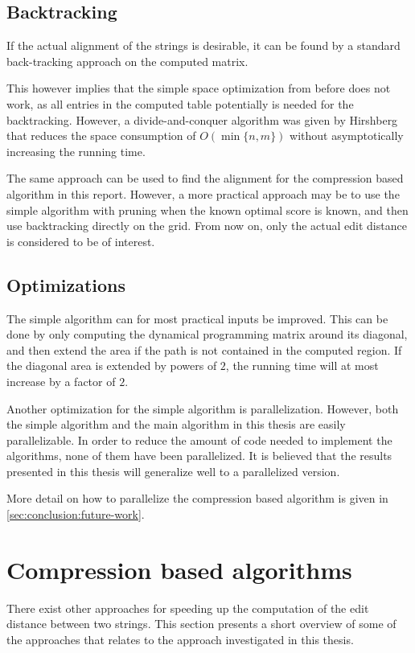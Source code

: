\documentclass[twoside,11pt,openright]{report}
\begin{document}
\subsection{Backtracking}
If the actual alignment of the strings is desirable, it can be found by a standard back-tracking approach on the computed matrix.

This however implies that the simple space optimization from before does not work, as all entries in the computed table potentially is needed for the backtracking. However, a divide-and-conquer algorithm was given by Hirshberg \cite[p. 254]{gusfield1997algorithms} that reduces the space consumption of $O(\min\{n, m\})$ without asymptotically increasing the running time.

The same approach can be used to find the alignment for the compression based algorithm in this report. However, a more practical approach may be to use the simple algorithm with pruning when the known optimal score is known, and then use backtracking directly on the grid. From now on, only the actual edit distance is considered to be of interest.

\subsection{Optimizations}
The simple algorithm can for most practical inputs be improved. This can be done by only computing the dynamical programming matrix around its diagonal, and then extend the area if the path is not contained in the computed region. If the diagonal area is extended by powers of $2$, the running time will at most increase by a factor of $2$.

Another optimization for the simple algorithm is parallelization. However, both the simple algorithm and the main algorithm in this thesis \cite{Gawrychowski:2012:FAC:2422024.2422048} are easily parallelizable. In order to reduce the amount of code needed to implement the algorithms, none of them have been parallelized. It is believed that the results presented in this thesis will generalize well to a parallelized version.

More detail on how to parallelize the compression based algorithm is given in \cref{sec:conclusion:future-work}.

\section{Compression based algorithms}
There exist other approaches for speeding up the computation of the edit distance between two strings. This section presents a short overview of some of the approaches that relates to the approach investigated in this thesis.
\end{document}
